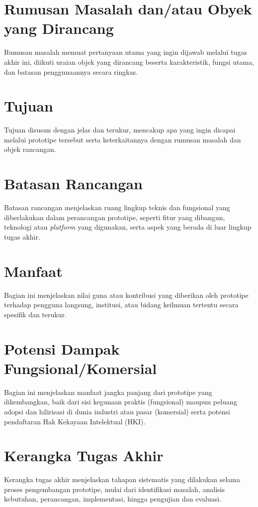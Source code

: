 \documentclass[prototipe,laporan]{itkta2025}
\begin{document}
\section{Rumusan Masalah dan/atau Obyek yang Dirancang}
Rumusan masalah memuat pertanyaan utama yang ingin dijawab melalui tugas akhir ini, diikuti uraian objek yang dirancang beserta karakteristik, fungsi utama, dan batasan penggunaannya secara ringkas.

\section{Tujuan}
Tujuan disusun dengan jelas dan terukur, mencakup apa yang ingin dicapai melalui prototipe tersebut serta keterkaitannya dengan rumusan masalah dan objek rancangan.

\section{Batasan Rancangan}
Batasan rancangan menjelaskan ruang lingkup teknis dan fungsional yang diberlakukan dalam perancangan prototipe, seperti fitur yang dibangun, teknologi atau \textit{platform} yang digunakan, serta aspek yang berada di luar lingkup tugas akhir.

\section{Manfaat}
Bagian ini menjelaskan nilai guna atau kontribusi yang diberikan oleh prototipe terhadap pengguna langsung, institusi, atau bidang keilmuan tertentu secara spesifik dan terukur.

\section{Potensi Dampak Fungsional/Komersial}
Bagian ini menjelaskan manfaat jangka panjang dari prototipe yang dikembangkan, baik dari sisi kegunaan praktis (fungsional) maupun peluang adopsi dan hilirisasi di dunia industri atau pasar (komersial) serta potensi pendaftaran Hak Kekayaan Intelektual (HKI).

\section{Kerangka Tugas Akhir}
Kerangka tugas akhir menjelaskan tahapan sistematis yang dilakukan selama proses pengembangan prototipe, mulai dari identifikasi masalah, analisis kebutuhan, perancangan, implementasi, hingga pengujian dan evaluasi.
\end{document}
